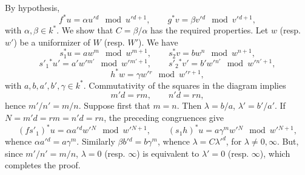 By hypothesis,
\[
f^*u=\alpha u'{}^d\mod {u'{}^{d+1}},\qquad
g^*v=\beta v'{}^d\mod {v'{}^{d+1}},
\]
with $\alpha,\beta\in k^*$. We show that $C=\beta/\alpha$ has the required properties. Let $w$ (resp. $w'$) be a uniformizer of $W$ (resp. $W'$). We have
\[
s_1^*u=aw^m\mod {w^{m+1}},\qquad
s_2^*v=bw^n\mod {w^{n+1}},
\]
\[
s'_1{}^*u'=a'w'{}^{m'}\mod {w'{}^{m'+1}},\qquad
s'_2{}^*v'=b'w'{}^{n'}\mod {w'{}^{n'+1}},
\]
\[
h^*w=\gamma w'{}^r\mod {w'{}^{r+1}},
\]
with $a,b,a',b',\gamma\in k^*$. Commutativity of the squares in the diagram implies
\[
m'd=rm,\qquad n'd=rn,
\]
hence $m'/n'=m/n$. Suppose first that $m=n$. Then $\lambda=b/a$, $\lambda'=b'/a'$. If $N=m'd=rm=n'd=rn$, the preceding congruences give
\[
(fs'_1)^*u=\alpha a'{}^d w'{}^N\mod {w'{}^{N+1}},\qquad
(s_1h)^*u=a\gamma^m w'{}^N\mod {w'{}^{N+1}},
\]
whence $\alpha a'{}^d=a\gamma^m$. Similarly $\beta b'{}^d=b\gamma^m$, whence $\lambda=C{\lambda'}^d$, for $\lambda\ne0,\infty$. But, since $m'/n'=m/n$, $\lambda=0$ (resp. $\infty$) is equivalent to $\lambda'=0$ (resp. $\infty$), which completes the proof.

